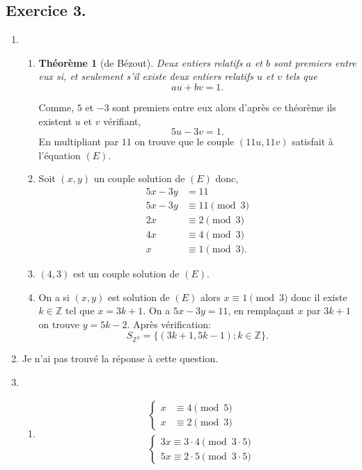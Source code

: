 \documentclass{article}
\newtheorem*{theorem}{Théorème}
\begin{document}
\subsection*{Exercice 3.}
	\begin{enumerate}
		\item \begin{enumerate}[label=(\alph*)]
			\item \begin{theorem}[de Bézout]
			Deux entiers relatifs $a$ et $b$ sont premiers entre eux si, et seulement s'il existe deux entiers relatifs $u$ et $v$ tels que $$au + bv = 1.$$
		\end{theorem}
		Comme, $5$ et $-3$ sont premiers entre eux alors d'après ce théorème ils existent $u$ et $v$ vérifiant, $$5u-3v=1.$$
		En multipliant par $11$ on trouve que le couple $(11u,11v)$ satisfait à l'équation $(E)$.
		\item Soit $(x,y)$ un couple solution de $(E)$ donc,\begin{align*}
			5x-3y&=11\\
			5x-3y&\equiv11\pmod{3}\\
			2x&\equiv2\pmod{3}\\
			4x&\equiv4\pmod{3}\\
			x&\equiv1\pmod{3}.
		\end{align*}
		\item $(4,3)$ est un couple solution de $(E)$.\\
		\item  On a si $(x,y)$ est solution de $(E)$ alors $x\equiv1\pmod{3}$ donc il existe $k\in\mathbb{Z}$ tel que $x=3k+1$. On a $5x-3y=11$, en remplaçant $x$ par $3k+1$ on trouve $y=5k-2$. Après vérification:
		$$S_{\mathbb{Z}^2}=\{(3k+1,5k-1);k\in\mathbb{Z}\}.$$
		\end{enumerate}
	\item Je n'ai pas trouvé la réponse à cette question.
	\item \begin{enumerate}[label=(\alph*)]
		\item \begin{align*}
			&\begin{cases}
				x &\equiv4 \pmod5\\
				x &\equiv2 \pmod3
			\end{cases}\\
			&\begin{cases}
				3x \equiv 3\cdot4\pmod{3\cdot5}\\
				5x \equiv 2\cdot5\pmod{3\cdot5}
			\end{cases}\\

\end{align*}
\end{enumerate}
\end{enumerate}
\end{document}
